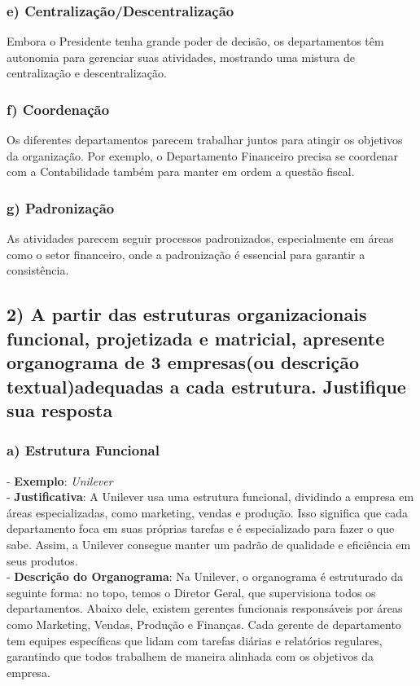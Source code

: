 \documentclass{article}
\begin{document}
	\subsubsection*{e) \textnormal{Centralização/Descentralização}}
	Embora o Presidente tenha grande poder de decisão, os departamentos têm autonomia para gerenciar suas atividades, mostrando uma mistura de centralização e descentralização.
	
	\subsubsection*{f) \textnormal{Coordenação}}
	Os diferentes departamentos parecem trabalhar juntos para atingir os objetivos da organização. Por exemplo, o Departamento Financeiro precisa se coordenar com a Contabilidade também para manter em ordem a questão fiscal.
	
	\subsubsection*{g) \textnormal{Padronização}}
	As atividades parecem seguir processos padronizados, especialmente em áreas como o setor financeiro, onde a padronização é essencial para garantir a consistência.
		

	\subsection*{2) \textnormal{A partir das estruturas organizacionais funcional, projetizada e matricial, apresente organograma de 3 empresas(ou descrição textual)adequadas a cada estrutura. Justifique sua resposta}}

	\subsubsection*{a) Estrutura Funcional}
	- \textbf{Exemplo}: \textit{Unilever} \\
	- \textbf{Justificativa}: A Unilever usa uma estrutura funcional, dividindo a empresa em áreas especializadas, como marketing, vendas e produção. Isso significa que cada departamento foca em suas próprias tarefas e é especializado para fazer o que sabe. Assim, a Unilever consegue manter um padrão de qualidade e eficiência em seus produtos. \\
	- \textbf{Descrição do Organograma}: Na Unilever, o organograma é estruturado da seguinte forma: no topo, temos o Diretor Geral, que supervisiona todos os departamentos. Abaixo dele, existem gerentes funcionais responsáveis por áreas como Marketing, Vendas, Produção e Finanças. Cada gerente de departamento tem equipes específicas que lidam com tarefas diárias e relatórios regulares, garantindo que todos trabalhem de maneira alinhada com os objetivos da empresa.
	
\end{document}
